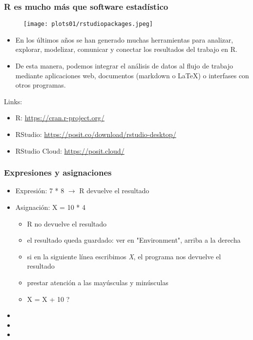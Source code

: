 \documentclass[11pt]{beamer}
\begin{document}
\begin{frame}
	\frametitle{R es mucho más que software estadístico}
\begin{multicols}{2}
\begin{figure}
	\centering
	\texttt{[image: plots01/rstudiopackages.jpeg]}
	\label{fig:rstudiopackages}
\end{figure}

\begin{itemize}
\footnotesize	\item En los últimos años se han generado muchas herramientas para analizar, explorar, modelizar, comunicar y conectar los resultados del trabajo en R.
	\item De esta manera, podemos integrar el análisis de datos al flujo de trabajo mediante aplicaciones web, documentos (markdown o \LaTeX) o interfases con otros programas.
\end{itemize}
\end{multicols}

	
Links:
\begin{itemize}
\scriptsize	\item R: \url{https://cran.r-project.org/}
	\item RStudio: \url{https://posit.co/download/rstudio-desktop/}
	\item RStudio Cloud: \url{https://posit.cloud/}
\end{itemize}	
\end{frame}

\begin{frame}
\frametitle{Expresiones y asignaciones}
\begin{itemize}
	\item Expresión:  7 * 8 $\rightarrow$ R devuelve el resultado
	\item Asignación: X = 10 * 4
	\begin{itemize}
		\item R no devuelve el resultado
		\item el resultado queda guardado: ver en "Environment", arriba a la derecha
		\item si en la siguiente línea escribimos \textit{X}, el programa nos devuelve el resultado
		\item prestar atención a las mayúsculas y minúsculas 
		\item X = X + 10 ?
	\end{itemize}
	\item {}
	\item {}
	\item {}
\end{itemize}
\end{frame}
\end{document}
